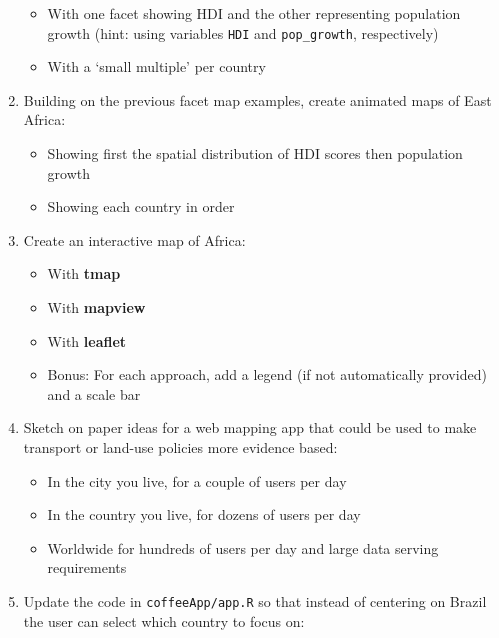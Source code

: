 \documentclass[]{krantz}
\providecommand{\tightlist}{%
  \setlength{\itemsep}{0pt}\setlength{\parskip}{0pt}}
\begin{document}
\begin{enumerate}
  \begin{itemize}
  \tightlist
  \item
    With one facet showing HDI and the other representing population growth (hint: using variables \texttt{HDI} and \texttt{pop\_growth}, respectively)
  \item
    With a `small multiple' per country
  \end{itemize}
\item
  Building on the previous facet map examples, create animated maps of East Africa:

  \begin{itemize}
  \tightlist
  \item
    Showing first the spatial distribution of HDI scores then population growth
  \item
    Showing each country in order
  \end{itemize}
\item
  Create an interactive map of Africa:

  \begin{itemize}
  \tightlist
  \item
    With \textbf{tmap}
  \item
    With \textbf{mapview}
  \item
    With \textbf{leaflet}
  \item
    Bonus: For each approach, add a legend (if not automatically provided) and a scale bar
  \end{itemize}
\item
  Sketch on paper ideas for a web mapping app that could be used to make transport or land-use policies more evidence based:

  \begin{itemize}
  \tightlist
  \item
    In the city you live, for a couple of users per day
  \item
    In the country you live, for dozens of users per day
  \item
    Worldwide for hundreds of users per day and large data serving requirements
  \end{itemize}
\item
  Update the code in \texttt{coffeeApp/app.R} so that instead of centering on Brazil the user can select which country to focus on:


\end{enumerate}
\end{document}

